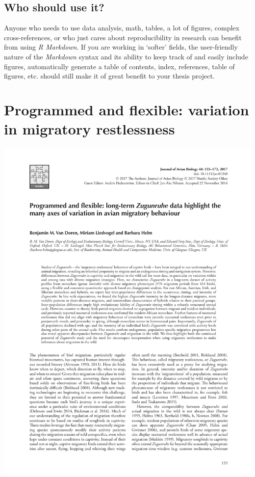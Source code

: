 \documentclass[a4paper, twoside]{templates/ociamthesis}
\begin{document}
\hypertarget{who-should-use-it}{%
\section*{Who should use it?}\label{who-should-use-it}}

Anyone who needs to use data analysis, math, tables, a lot of figures, complex cross-references, or who just cares about reproducibility in research can benefit from using \emph{R Markdown}.
If you are working in `softer' fields, the user-friendly nature of the \emph{Markdown} syntax and its ability to keep track of and easily include figures, automatically generate a table of contents, index, references, table of figures, etc. should still make it of great benefit to your thesis project.

\hypertarget{programmed-and-flexible}{%
\chapter{Programmed and flexible: variation in migratory restlessness}\label{programmed-and-flexible}}

\minitoc 

\newpage

\begin{center}\includegraphics[width=1\linewidth]{pdf_chapters/zug/zug_crop_Part01} \end{center}
\end{document}
